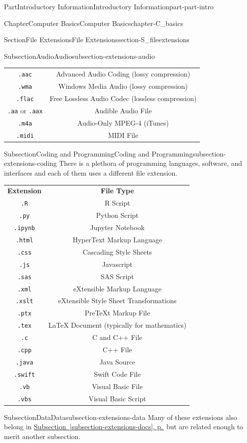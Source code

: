 \documentclass[twoside,10pt,]{book}
\newcommand{\tabularfont}{\relax}
\newcommand{\xreffont}{\relax}
\newcommand{\mono}[1]{\texttt{#1}}
\begin{document}
\begin{partptx}{Part}{Introductory Information}{}{Introductory Information}{}{}{part-part-intro}
\begin{chapterptx}{Chapter}{Computer Basics}{}{Computer Basics}{}{}{chapter-C_basics}
\begin{sectionptx}{Section}{File Extensions}{}{File Extensions}{}{}{section-S_fileextensions}
\begin{subsectionptx}{Subsection}{Audio}{}{Audio}{}{}{subsection-extensions-audio}
\begin{center}
{\begin{tabular}{cc}
\mono{.aac}&Advanced Audio Coding (lossy compression)\tabularnewline[0pt]
\mono{.wma}&Windows Media Audio (lossy compression)\tabularnewline[0pt]
\mono{.flac}&Free Lossless Audio Codec (lossless compression)\tabularnewline[0pt]
\mono{.aa} or \mono{.aax}&Audible Audio File\tabularnewline[0pt]
\mono{.m4a}&Audio-Only MPEG-4 (iTunes)\tabularnewline[0pt]
\mono{.midi}&MIDI File
\end{tabular}
}%
\end{center}%
\end{subsectionptx}
%
%
\typeout{************************************************}
\typeout{************************************************}
%
\begin{subsectionptx}{Subsection}{Coding and Programming}{}{Coding and Programming}{}{}{subsection-extensions-coding}
%
There is a plethora of programming languages, software, and interfaces and each of them uses a different file extension.%
\begin{center}%
{\tabularfont%
\begin{tabular}{cc}
{\bfseries{}Extension}&{\bfseries{}File Type}\tabularnewline[0pt]
\mono{.R}&R Script\tabularnewline[0pt]
\mono{.py}&Python Script\tabularnewline[0pt]
\mono{.ipynb}&Jupyter Notebook\tabularnewline[0pt]
\mono{.html}&HyperText Markup Language\tabularnewline[0pt]
\mono{.css}&Cascading Style Sheets\tabularnewline[0pt]
\mono{.js}&Javascript\tabularnewline[0pt]
\mono{.sas}&SAS Script\tabularnewline[0pt]
\mono{.xml}&eXtensible Markup Language\tabularnewline[0pt]
\mono{.xslt}&eXtensible Style Sheet Transformations\tabularnewline[0pt]
\mono{.ptx}&PreTeXt Markup File\tabularnewline[0pt]
\mono{.tex}&LaTeX Document (typically for mathematics)\tabularnewline[0pt]
\mono{.c}&C and C++ File\tabularnewline[0pt]
\mono{.cpp}&C++ File\tabularnewline[0pt]
\mono{.java}&Java Source\tabularnewline[0pt]
\mono{.swift}&Swift Code File\tabularnewline[0pt]
\mono{.vb}&Visual Basic File\tabularnewline[0pt]
\mono{.vbs}&Visual Basic Script
\end{tabular}
}%
\end{center}%
\end{subsectionptx}
%
%
\typeout{************************************************}
\typeout{************************************************}
%
\begin{subsectionptx}{Subsection}{Data}{}{Data}{}{}{subsection-extensions-data}
%
Many of these extensions also belong in \hyperref[subsection-extensions-docs]{Subsection~{\xreffont\ref{subsection-extensions-docs}}, p.\,\pageref{subsection-extensions-docs}} but are related enough to merit another subsection.%

\end{subsectionptx}
\end{sectionptx}
\end{chapterptx}
\end{partptx}
\end{document}
